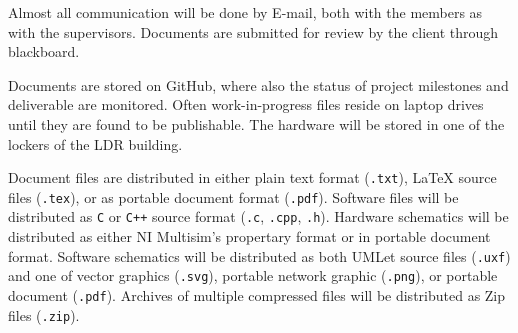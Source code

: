 Almost all communication will be done by E-mail, both with the members as with the supervisors. Documents are submitted for review by the client through blackboard.

Documents are stored on GitHub\cite{github}, where also the status of project milestones and deliverable are monitored. Often work-in-progress files reside on laptop drives until they are found to be publishable.  The hardware will be stored in one of the lockers of the LDR building.

Document files are distributed in either plain text format (\verb+.txt+), \LaTeX{} source files (\verb+.tex+), or as portable document format (\verb+.pdf+). Software files will be distributed as \verb+C+ or \verb-C++- source format (\verb+.c+, \verb+.cpp+, \verb+.h+). Hardware schematics will be distributed as either NI Multisim's propertary format or in portable document format. Software schematics will be distributed as both UMLet source files (\verb+.uxf+) and one of vector graphics (\verb+.svg+), portable network graphic (\verb+.png+), or portable document (\verb+.pdf+). Archives of multiple compressed files will be distributed as Zip files (\verb+.zip+).


